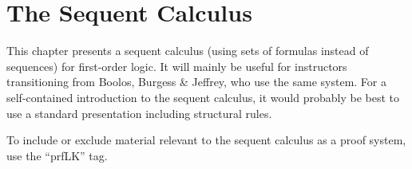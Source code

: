 \documentclass[../../../include/open-logic-chapter]{subfiles}
\begin{document}
\chapter{The Sequent Calculus}

\begin{editorial}
  This chapter presents a sequent calculus (using sets of formulas
  instead of sequences) for first-order logic.  It will mainly be
  useful for instructors transitioning from Boolos, Burgess \&
  Jeffrey, who use the same system.  For a self-contained introduction
  to the sequent calculus, it would probably be best to use a standard
  presentation including structural rules.

To include or exclude material relevant to the sequent calculus as a
proof system, use the ``prfLK'' tag.
\end{editorial}







\OLEndChapterHook
\end{document}
